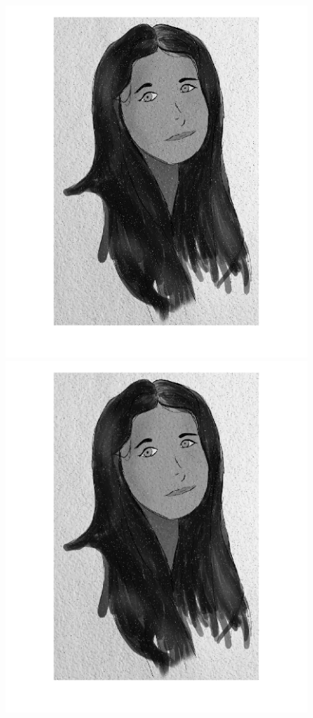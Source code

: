 \begin{figure}[htb] \centering
\includegraphics[scale=0.15,trim={0cm 3cm 3cm 0cm},clip]{Pictures/Esempi di utilizzo/Esempio 5/ami_originale_resize.png}
\includegraphics[scale=0.15,trim={3cm 3cm 0cm 0cm},clip]{Pictures/Esempi di utilizzo/Esempio 5/ami_filtrata_sigma0_5_resize.png}

\end{figure}
